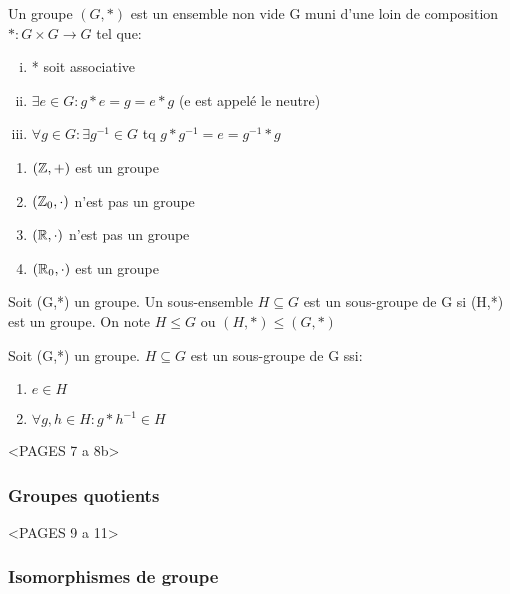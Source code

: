 \begin{defn}
Un groupe $(G,*)$ est un ensemble non vide G muni d'une loin de composition $* : G \times G \rightarrow G$ tel que:

\begin{enumerate}[(i)]
\item * soit associative
\item $\exists e \in G: g*e = g = e*g$ (e est appelé le neutre)
\item $\forall g \in G: \exists g^{-1} \in G$ tq $g*g^{-1} = e = g^{-1}*g$
\end{enumerate}
\end{defn}

\begin{exmp}
	\begin{enumerate}
	\item $(\mathbb{Z},+)$ est un groupe
	\item $(\mathbb{Z}_0,\cdot)$ n'est pas un groupe
	\item $(\mathbb{R},\cdot)$ n'est pas un groupe
	\item $(\mathbb{R}_0,\cdot)$ est un groupe
	\end{enumerate}
\end{exmp}

\begin{defn}
Soit (G,*) un groupe. Un sous-ensemble $H \subseteq G$ est un sous-groupe de G si (H,*) est un groupe. On note $H \leq G$ ou $(H,*) \leq (G,*)$
\end{defn}

\begin{prop}
Soit (G,*) un groupe. $H \subseteq G$ est un sous-groupe de G ssi:
	\begin{enumerate}
	\item $e \in H$
	\item $\forall g,h \in H: g*h^{-1} \in H$
	\end{enumerate} 
\end{prop}

<PAGES 7 a 8b>

\subsubsection{Groupes quotients}

<PAGES 9 a 11>

\subsubsection{Isomorphismes de groupe}

